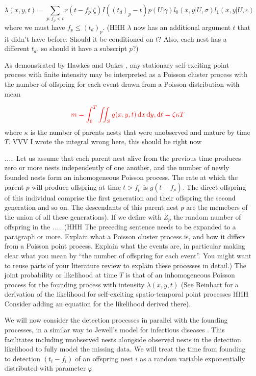 \documentclass{article}
\renewcommand{\d}[1]{\ensuremath{\operatorname{d}\!{#1}}}
\begin{document}
{\color{red}
\begin{equation*}
    \lambda(x, y, t) = \sum_{p:f_p < t} r(t - f_p | \zeta) I((t_d)_p - t) p(U | \gamma) l_0(x, y | U, \sigma) l_1(x, y | U, c)
\end{equation*}}
where we must have $f_p\leq (t_d)_p$. (HHH $\lambda$ now has an additional argument $t$ that it didn't have before. Should it be conditioned on $t$? Also, each nest has a different $t_d$, so should it have a subscript $p$?)

As demonstrated by Hawkes and Oakes \cite{Hawkes74}, any stationary self-exciting point process with finite intensity may be interpreted as a Poisson cluster process with the number of offspring for each event drawn from a Poisson distribution with mean 

\begin{equation} \label{eq:NumOffsp}
    {\color{red} m = \int_0^{T} \iint_S g(x, y, t)\d x \d y, \d t = \zeta \kappa T}
\end{equation}
{\color{red} where $\kappa$ is the number of parents nests that were unobserved and mature by time $T$. VVV I wrote the integral wrong here, this should be right now}

{\color{red} ..... Let us assume that each parent nest alive from the previous time produces zero or more nests independently of one another, and the number of newly founded nests form an inhomogeneous Poisson process. The rate at which the parent $p$ will produce offspring at time $t > f_p$ is $g(t - f_p)$. The direct offspring of this individual comprise the first generation and their offspring the second generation and so on. The descendants of this parent nest $p$ are the memebers of the union of all these generations). If we define with $Z_p$ the random number of offspring in the  ..... }
(HHH The preceding sentence needs to be expanded to a paragraph or more. Explain what a Poisson cluster process is, and how it differs from a Poisson point process. Explain what the events are, in particular making clear what you mean by ``the number of offspring for each event''. You might want to reuse parts of your literature review to explain these processes in detail.)
The joint probability or likelihood at time $T$ is that of an inhomogeneous Poisson process for the founding process with intensity $\lambda(x, y, t)$ (See Reinhart \cite{Reinhart} for a derivation of the likelihood for self-exciting spatio-temporal point processes HHH Consider adding an equation for the likelihood derived there).

We will now consider the detection processes in parallel with the founding processes, in a similar way to Jewell's model for infectious diseases \cite{Jewell}. This facilitates including unobserved nests alongside observed nests in the detection likelihood to fully model the missing data. We will treat the time from {\color{red}founding to detection} $(t_i - f_i)$ of an offspring nest $i$ as a random variable exponentially distributed with parameter $\varphi$
\end{document}
